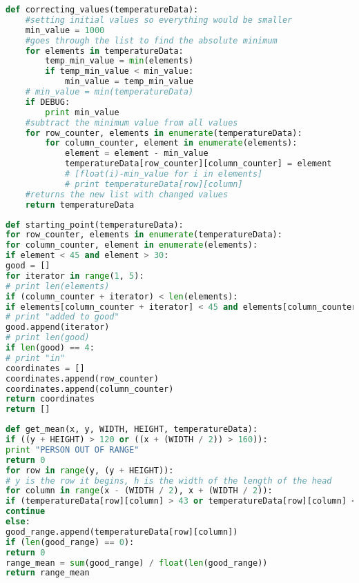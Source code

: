 \begin{lstlisting}[language=Python, caption=Correcting the values from the CSV file]
	def correcting_values(temperatureData):
	#setting initial values so everything would be smaller
	min_value = 1000
	#goes through the list to find the absolute minimum
	for elements in temperatureData:
		temp_min_value = min(elements)
		if temp_min_value < min_value:
			min_value = temp_min_value
	# min_value = min(temperatureData)
	if DEBUG:
		print min_value
	#subtract the minimum value from all values
	for row_counter, elements in enumerate(temperatureData):
		for column_counter, element in enumerate(elements):
			element = element - min_value
			temperatureData[row_counter][column_counter] = element
			# [float(i)-min_value for i in elements]
			# print temperatureData[row][column]
	#returns the new list with changed values
	return temperatureData

\end{lstlisting}

\begin{lstlisting}[language=Python, caption=Finding the persons head in the picture]
def starting_point(temperatureData):
for row_counter, elements in enumerate(temperatureData):
for column_counter, element in enumerate(elements):
if element < 45 and element > 30:
good = []
for iterator in range(1, 5):
# print len(elements)
if (column_counter + iterator) < len(elements):
if elements[column_counter + iterator] < 45 and elements[column_counter + iterator] > 30:
# print "added to good"
good.append(iterator)
# print len(good)
if len(good) == 4:
# print "in"
coordinates = []
coordinates.append(row_counter)
coordinates.append(column_counter)
return coordinates
return []
\end{lstlisting}


\begin{lstlisting}[language=Python, caption=Claculating the mean temperature value]
def get_mean(x, y, WIDTH, HEIGHT, temperatureData):
if ((y + HEIGHT) > 120 or ((x + (WIDTH / 2)) > 160)):
print "PERSON OUT OF RANGE"
return 0
for row in range(y, (y + HEIGHT)):
# y is the row it begins, h is the width of the length of the head
for column in range(x - (WIDTH / 2), x + (WIDTH / 2)):
if (temperatureData[row][column] > 43 or temperatureData[row][column] < 35):
continue
else:
good_range.append(temperatureData[row][column])
if (len(good_range) == 0):
return 0
range_mean = sum(good_range) / float(len(good_range))
return range_mean
\end{lstlisting}



